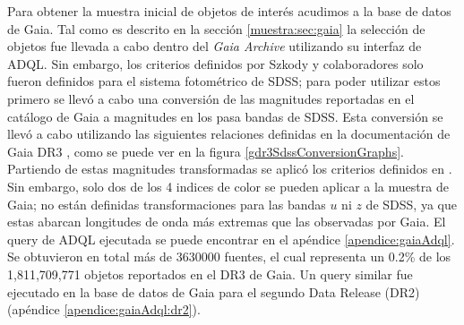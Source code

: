 Para obtener la muestra inicial de objetos de interés acudimos a la base de
datos de Gaia. Tal como es descrito en la sección \ref{muestra:sec:gaia} la
selección de objetos fue llevada a cabo dentro del \textit{Gaia Archive}
utilizando su interfaz de ADQL. Sin embargo, los criterios definidos por Szkody
y colaboradores solo fueron definidos para el sistema fotométrico de SDSS; para
poder utilizar estos primero se llevó a cabo una conversión de las magnitudes
reportadas en el catálogo de Gaia a magnitudes en los pasa bandas de SDSS. Esta
conversión se llevó a cabo utilizando las siguientes relaciones definidas en la
documentación de Gaia DR3 \citet{gdr3ReleaseDocumentation}, como se puede
ver en la figura \ref{gdr3SdssConversionGraphs}. Partiendo de estas magnitudes
transformadas se aplicó los criterios definidos en
\citet{szkody2002CvSearchSdss}. Sin embargo, solo dos de los 4 indices de color
se pueden aplicar a la muestra de Gaia; no están definidas transformaciones para
las bandas $u$ ni $z$ de SDSS, ya que estas abarcan longitudes de onda más
extremas que las observadas por Gaia. El query de ADQL ejecutada se puede
encontrar en el apéndice \ref{apendice:gaiaAdql}. Se obtuvieron en total más de
\num{3630000} fuentes, el cual representa un 0.2\% de los 1,811,709,771 objetos
reportados en el DR3 de Gaia. Un query similar fue ejecutado en la base de datos
de Gaia para el segundo Data Release (DR2) (apéndice \ref{apendice:gaiaAdql:dr2}). 



